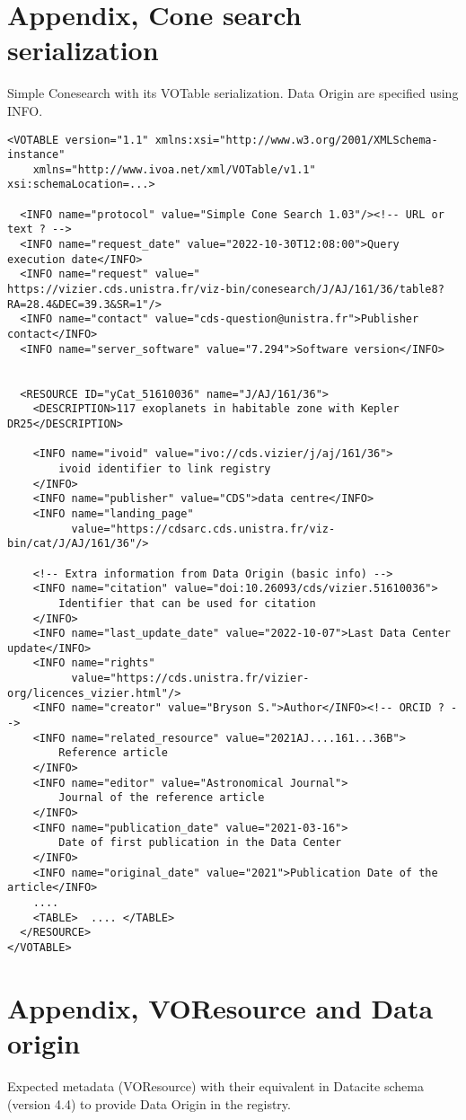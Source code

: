 \documentclass[11pt,a4paper]{ivoa}
\begin{document}
\section{Appendix, Cone search serialization}\label{sec:appendixA}
Simple Conesearch with its VOTable serialization. Data Origin are specified using  INFO.
\begin{verbatim}
<VOTABLE version="1.1" xmlns:xsi="http://www.w3.org/2001/XMLSchema-instance"
    xmlns="http://www.ivoa.net/xml/VOTable/v1.1" xsi:schemaLocation=...>

  <INFO name="protocol" value="Simple Cone Search 1.03"/><!-- URL or text ? -->
  <INFO name="request_date" value="2022-10-30T12:08:00">Query execution date</INFO>
  <INFO name="request" value="
https://vizier.cds.unistra.fr/viz-bin/conesearch/J/AJ/161/36/table8?
RA=28.4&DEC=39.3&SR=1"/>
  <INFO name="contact" value="cds-question@unistra.fr">Publisher contact</INFO>
  <INFO name="server_software" value="7.294">Software version</INFO>


  <RESOURCE ID="yCat_51610036" name="J/AJ/161/36">
    <DESCRIPTION>117 exoplanets in habitable zone with Kepler DR25</DESCRIPTION>

    <INFO name="ivoid" value="ivo://cds.vizier/j/aj/161/36">
        ivoid identifier to link registry
    </INFO>
    <INFO name="publisher" value="CDS">data centre</INFO>
    <INFO name="landing_page"
          value="https://cdsarc.cds.unistra.fr/viz-bin/cat/J/AJ/161/36"/>

    <!-- Extra information from Data Origin (basic info) -->
    <INFO name="citation" value="doi:10.26093/cds/vizier.51610036">
        Identifier that can be used for citation
    </INFO>
    <INFO name="last_update_date" value="2022-10-07">Last Data Center update</INFO>
    <INFO name="rights"
          value="https://cds.unistra.fr/vizier-org/licences_vizier.html"/>
    <INFO name="creator" value="Bryson S.">Author</INFO><!-- ORCID ? -->
    <INFO name="related_resource" value="2021AJ....161...36B">
        Reference article
    </INFO>
    <INFO name="editor" value="Astronomical Journal">
        Journal of the reference article
    </INFO>
    <INFO name="publication_date" value="2021-03-16">
        Date of first publication in the Data Center
    </INFO>
    <INFO name="original_date" value="2021">Publication Date of the article</INFO>
    ....
    <TABLE>  .... </TABLE>
  </RESOURCE>
</VOTABLE>
\end{verbatim}

\section{Appendix, VOResource and Data origin}\label{sec:appendixB}
Expected metadata (VOResource) with their equivalent in Datacite schema (version 4.4) to provide Data Origin in the registry.\\
\end{document}
